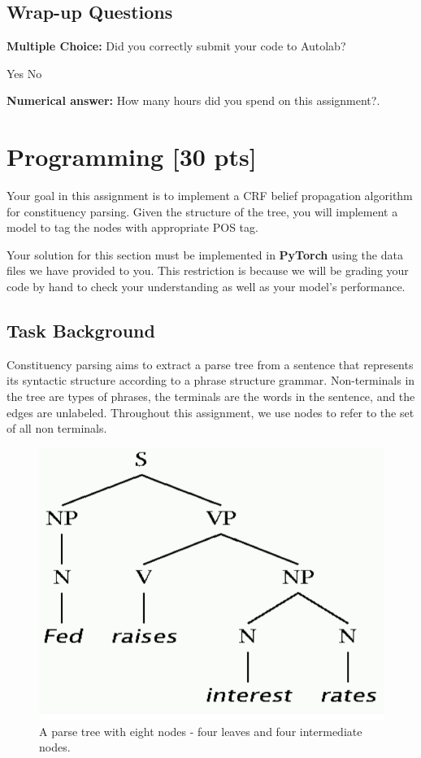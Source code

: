 \documentclass[11pt,addpoints,answers]{exam}
\numberwithin{equation}{section} %
\numberwithin{figure}{section} %
\numberwithin{table}{section} %
\newcommand{\pts}[1]{\textbf{[#1 pts]}}
\begin{document}
\subsection{Wrap-up Questions}

\begin{questions}


\question[1] \textbf{Multiple Choice:} Did you correctly submit your code to Autolab?
    \begin{checkboxes}
     \choice Yes 
     \choice No
    \end{checkboxes}

\question[1] \textbf{Numerical answer:} How many hours did you spend on this assignment?.
    \begin{tcolorbox}[fit,height=1cm, width=2cm, blank, borderline={1pt}{-2pt}]
    \end{tcolorbox}

\end{questions}
\clearpage
\section{Programming \pts{30}}
\label{sec:code}

Your goal in this assignment is to implement a CRF belief propagation algorithm for  constituency parsing. Given the structure of the tree, you will implement a model to tag the nodes with appropriate POS tag.


Your solution for this section must be implemented in \textbf{PyTorch} using the data files we have provided to you. This restriction is because we will be grading your code by hand to check your understanding as well as your model's performance. 

\subsection{Task Background}

Constituency parsing aims to extract a parse tree from a sentence that represents its syntactic structure according to a phrase structure grammar.  Non-terminals in the tree are types of phrases, the terminals are the words in the sentence, and the edges are unlabeled. Throughout this assignment, we use nodes to refer to the set of all non terminals. 

\begin{figure}[h]
\centering
\includegraphics[width=0.50\linewidth]{fig/parsetree.png}
\caption{A parse tree with eight nodes - four leaves and four intermediate nodes.}
\label{overflow}
\end{figure}
\end{document}

